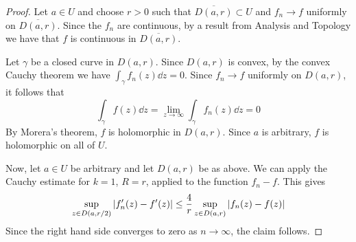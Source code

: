 \begin{proof}
	Let \( a \in U \) and choose \( r > 0 \) such that \( \overline{D(a,r)} \subset U \) and \( f_n \to f \) uniformly on \( \overline{D(a,r)} \).
	Since the \( f_n \) are continuous, by a result from Analysis and Topology we have that \( f \) is continuous in \( \overline{D(a,r)} \).

	Let \( \gamma \) be a closed curve in \( D(a,r) \).
	Since \( D(a,r) \) is convex, by the convex Cauchy theorem we have \( \int_\gamma f_n(z) \dd{z} = 0 \).
	Since \( f_n \to f \) uniformly on \( D(a,r) \), it follows that
	\[
		\int_\gamma f(z) \dd{z} = \lim_{z \to \infty} \int_\gamma f_n(z) \dd{z} = 0
	\]
	By Morera's theorem, \( f \) is holomorphic in \( D(a,r) \).
	Since \( a \) is arbitrary, \( f \) is holomorphic on all of \( U \).

	Now, let \( a \in U \) be arbitrary and let \( D(a,r) \) be as above.
	We can apply the Cauchy estimate for \( k = 1 \), \( R = r \), applied to the function \( f_n - f \).
	This gives
	\[
		\sup_{z \in D(a,r/2)} \abs{f_n'(z) - f'(z)} \leq \frac{4}{r} \sup_{z \in D(a,r)} \abs{f_n(z) - f(z)}
	\]
	Since the right hand side converges to zero as \( n \to \infty \), the claim follows.
\end{proof}

